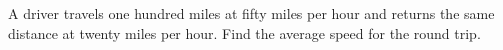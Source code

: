A driver travels one hundred miles at fifty miles per hour and returns the same distance at twenty miles per hour. Find the average speed for the round trip.
